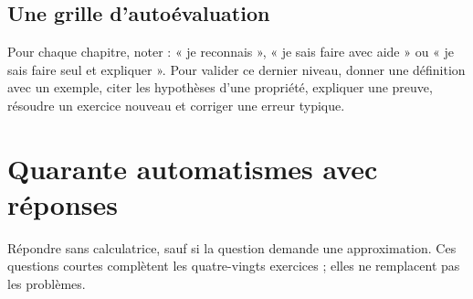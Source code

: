 \documentclass[11pt,a4paper,oneside]{book}
\begin{document}
\section{Une grille d'autoévaluation}
Pour chaque chapitre, noter : « je reconnais », « je sais faire avec aide » ou « je sais faire seul et expliquer ». Pour valider ce dernier niveau, donner une définition avec un exemple, citer les hypothèses d'une propriété, expliquer une preuve, résoudre un exercice nouveau et corriger une erreur typique.
\chapter{Quarante automatismes avec réponses}
Répondre sans calculatrice, sauf si la question demande une approximation. Ces questions courtes complètent les quatre-vingts exercices ; elles ne remplacent pas les problèmes.
\end{document}
